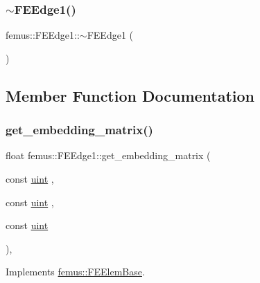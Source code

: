\subsubsection{\texorpdfstring{$\sim$\+F\+E\+Edge1()}{~FEEdge1()}}
{\footnotesize\ttfamily femus\+::\+F\+E\+Edge1\+::$\sim$\+F\+E\+Edge1 (\begin{DoxyParamCaption}{ }\end{DoxyParamCaption})}



\subsection{Member Function Documentation}
\mbox{\label{classfemus_1_1_f_e_edge1_a25ca224b3f755062f03cc12d9da92a9a}} 
\subsubsection{\texorpdfstring{get\+\_\+embedding\+\_\+matrix()}{get\_embedding\_matrix()}}
{\footnotesize\ttfamily float femus\+::\+F\+E\+Edge1\+::get\+\_\+embedding\+\_\+matrix (\begin{DoxyParamCaption}\item[{const \mbox{\hyperlink{_typedefs_8hpp_a91ad9478d81a7aaf2593e8d9c3d06a14}{uint}}}]{,  }\item[{const \mbox{\hyperlink{_typedefs_8hpp_a91ad9478d81a7aaf2593e8d9c3d06a14}{uint}}}]{,  }\item[{const \mbox{\hyperlink{_typedefs_8hpp_a91ad9478d81a7aaf2593e8d9c3d06a14}{uint}}}]{ }\end{DoxyParamCaption})\hspace{0.3cm}{\ttfamily [inline]}, {\ttfamily [virtual]}}



Implements \mbox{\hyperlink{classfemus_1_1_f_e_elem_base_a0c4d6d5ec66bd4e301eb8ea2ef10f354}{femus\+::\+F\+E\+Elem\+Base}}.

\mbox{\label{classfemus_1_1_f_e_edge1_a65a8e90e45a7db19520776609184a51f}} 
